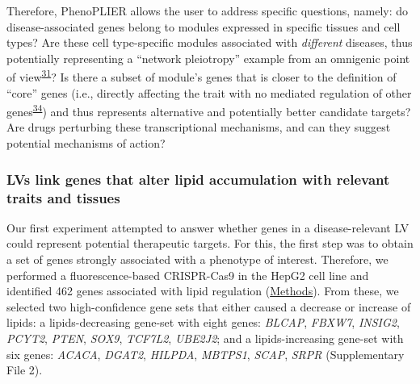 \documentclass[
  a4paper,
]{article}
\begin{document}
Therefore, PhenoPLIER allows the user to address specific questions, namely:
do disease-associated genes belong to modules expressed in specific tissues and cell types?
Are these cell type-specific modules associated with \emph{different} diseases, thus potentially representing a ``network pleiotropy'' example from an omnigenic point of view\textsuperscript{\protect\hyperlink{ref-vpIDZCSa}{31}}?
Is there a subset of module's genes that is closer to the definition of ``core'' genes (i.e., directly affecting the trait with no mediated regulation of other genes\textsuperscript{\protect\hyperlink{ref-LXvTZzEA}{34}}) and thus represents alternative and potentially better candidate targets?
Are drugs perturbing these transcriptional mechanisms, and can they suggest potential mechanisms of action?

\hypertarget{lvs-link-genes-that-alter-lipid-accumulation-with-relevant-traits-and-tissues}{%
\subsubsection{LVs link genes that alter lipid accumulation with relevant traits and tissues}\label{lvs-link-genes-that-alter-lipid-accumulation-with-relevant-traits-and-tissues}}

Our first experiment attempted to answer whether genes in a disease-relevant LV could represent potential therapeutic targets.
For this, the first step was to obtain a set of genes strongly associated with a phenotype of interest.
Therefore, we performed a fluorescence-based CRISPR-Cas9 in the HepG2 cell line and identified 462 genes associated with lipid regulation (\protect\hyperlink{sec:methods:crispr}{Methods}).
From these, we selected two high-confidence gene sets that either caused a decrease or increase of lipids:
a lipids-decreasing gene-set with eight genes: \emph{BLCAP}, \emph{FBXW7}, \emph{INSIG2}, \emph{PCYT2}, \emph{PTEN}, \emph{SOX9}, \emph{TCF7L2}, \emph{UBE2J2};
and a lipids-increasing gene-set with six genes: \emph{ACACA}, \emph{DGAT2}, \emph{HILPDA}, \emph{MBTPS1}, \emph{SCAP}, \emph{SRPR} (Supplementary File 2).
\end{document}
